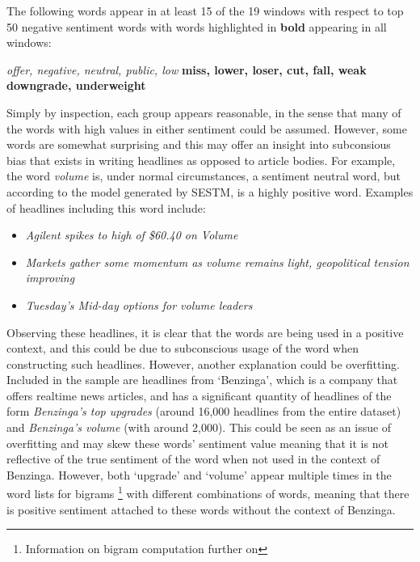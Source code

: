 \noindent
The following words appear in at least 15 of the 19 windows with respect to top 50 negative sentiment words with words highlighted in \textbf{bold} appearing in all windows:
\begin{center}
      \textit{offer, negative, neutral, public, low} \textbf{miss, lower, loser, cut, fall, weak downgrade, underweight}
\end{center}

Simply by inspection, each group appears reasonable, in the sense that many of the words with high values in either sentiment could be assumed. However, some words are somewhat surprising and this may offer an insight into subconsious bias that exists in writing headlines as opposed to article bodies. For example, the word \textit{volume} is, under normal circumstances, a sentiment neutral word, but according to the model generated by SESTM, is a highly positive word. Examples of headlines including this word include:
\begin{itemize}
      \item \textit{Agilent spikes to high of \$60.40 on Volume}
      \item \textit{Markets gather some momentum as volume remains light, geopolitical tension improving}
      \item \textit{Tuesday's Mid-day options for volume leaders}
\end{itemize}

Observing these headlines, it is clear that the words are being used in a positive context, and this could be due to subconscious usage of the word when constructing such headlines. However, another explanation could be overfitting. Included in the sample are headlines from `Benzinga', which is a company that offers realtime news articles, and has a significant quantity of headlines of the form \textit{Benzinga's top upgrades} (around 16,000 headlines from the entire dataset) and \textit{Benzinga's volume} (with around 2,000). This could be seen as an issue of overfitting and may skew these words' sentiment value meaning that it is not reflective of the true sentiment of the word when not used in the context of Benzinga. However, both `upgrade' and `volume' appear multiple times in the word lists for bigrams \footnote{Information on bigram computation further on} with different combinations of words, meaning that there is positive sentiment attached to these words without the context of Benzinga.

